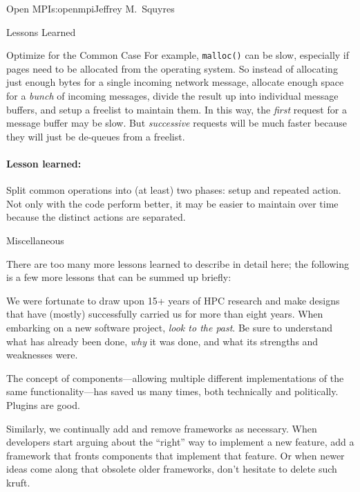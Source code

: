 \begin{aosachapter}{Open MPI}{s:openmpi}{Jeffrey M.\ Squyres}
\begin{aosasect1}{Lessons Learned}
\begin{aosasect2}{Optimize for the Common Case}
For example, {\tt malloc()} can be slow, especially if pages need to
be allocated from the operating system.  So instead of allocating just
enough bytes for a single incoming network message, allocate enough
space for a \emph{bunch} of incoming messages, divide the result up
into individual message buffers, and setup a freelist to maintain
them.  In this way, the \emph{first} request for a message buffer may
be slow.  But \emph{successive} requests will be much faster because
they will just be de-queues from a freelist.


\paragraph{Lesson learned:} Split common operations into (at least)
two phases: setup and repeated action.  Not only with the code perform
better, it may be easier to maintain over time because the distinct
actions are separated.

\end{aosasect2}


\begin{aosasect2}{Miscellaneous}

There are too many more lessons learned to describe in detail here;
the following is a few more lessons that can be summed up briefly:

\begin{aosaitemize}
\item We were fortunate to draw upon 15+ years of HPC research and
  make designs that have (mostly) successfully carried us for more
  than eight years.  When embarking on a new software project,
  \emph{look to the past}.  Be sure to understand what has already
  been done, \emph{why} it was done, and what its strengths and
  weaknesses were.

\item The concept of components---allowing multiple different
  implementations of the same functionality---has saved us many
  times, both technically and politically.  Plugins are good.

\item Similarly, we continually add and remove frameworks as
  necessary.  When developers start arguing about the ``right'' way to
  implement a new feature, add a framework that fronts components that
  implement that feature.  Or when newer ideas come along that
  obsolete older frameworks, don't hesitate to delete such kruft.


\end{aosaitemize}
\end{aosasect2}
\end{aosasect1}
\end{aosachapter}

